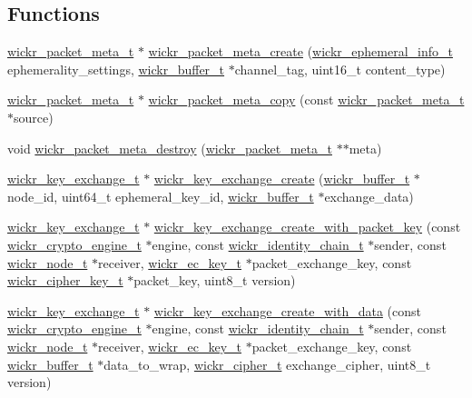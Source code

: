 \subsection*{Functions}
\begin{DoxyCompactItemize}
\item 
\hyperlink{structwickr__packet__meta}{wickr\+\_\+packet\+\_\+meta\+\_\+t} $\ast$ \hyperlink{group__wickr__protocol_ga146144d74da12c1fff766462fe7fa661}{wickr\+\_\+packet\+\_\+meta\+\_\+create} (\hyperlink{structwickr__ephemeral__info}{wickr\+\_\+ephemeral\+\_\+info\+\_\+t} ephemerality\+\_\+settings, \hyperlink{structwickr__buffer}{wickr\+\_\+buffer\+\_\+t} $\ast$channel\+\_\+tag, uint16\+\_\+t content\+\_\+type)
\item 
\hyperlink{structwickr__packet__meta}{wickr\+\_\+packet\+\_\+meta\+\_\+t} $\ast$ \hyperlink{group__wickr__protocol_ga1bb5a0f2a49069679b174b3e6521fe9b}{wickr\+\_\+packet\+\_\+meta\+\_\+copy} (const \hyperlink{structwickr__packet__meta}{wickr\+\_\+packet\+\_\+meta\+\_\+t} $\ast$source)
\item 
void \hyperlink{group__wickr__protocol_gad165ad670da761478cf5f8f91223c1d3}{wickr\+\_\+packet\+\_\+meta\+\_\+destroy} (\hyperlink{structwickr__packet__meta}{wickr\+\_\+packet\+\_\+meta\+\_\+t} $\ast$$\ast$meta)
\item 
\hyperlink{structwickr__key__exchange}{wickr\+\_\+key\+\_\+exchange\+\_\+t} $\ast$ \hyperlink{group__wickr__protocol_gac2823b3430070b0db9ef1f40d3a804ea}{wickr\+\_\+key\+\_\+exchange\+\_\+create} (\hyperlink{structwickr__buffer}{wickr\+\_\+buffer\+\_\+t} $\ast$node\+\_\+id, uint64\+\_\+t ephemeral\+\_\+key\+\_\+id, \hyperlink{structwickr__buffer}{wickr\+\_\+buffer\+\_\+t} $\ast$exchange\+\_\+data)
\item 
\hyperlink{structwickr__key__exchange}{wickr\+\_\+key\+\_\+exchange\+\_\+t} $\ast$ \hyperlink{group__wickr__protocol_ga26d4b847f11801354e4111d3ec1d1d13}{wickr\+\_\+key\+\_\+exchange\+\_\+create\+\_\+with\+\_\+packet\+\_\+key} (const \hyperlink{structwickr__crypto__engine}{wickr\+\_\+crypto\+\_\+engine\+\_\+t} $\ast$engine, const \hyperlink{structwickr__identity__chain}{wickr\+\_\+identity\+\_\+chain\+\_\+t} $\ast$sender, const \hyperlink{structwickr__node}{wickr\+\_\+node\+\_\+t} $\ast$receiver, \hyperlink{structwickr__ec__key}{wickr\+\_\+ec\+\_\+key\+\_\+t} $\ast$packet\+\_\+exchange\+\_\+key, const \hyperlink{structwickr__cipher__key}{wickr\+\_\+cipher\+\_\+key\+\_\+t} $\ast$packet\+\_\+key, uint8\+\_\+t version)
\item 
\hyperlink{structwickr__key__exchange}{wickr\+\_\+key\+\_\+exchange\+\_\+t} $\ast$ \hyperlink{group__wickr__protocol_ga9e69db5af6825e72c443dd5ef3605a5b}{wickr\+\_\+key\+\_\+exchange\+\_\+create\+\_\+with\+\_\+data} (const \hyperlink{structwickr__crypto__engine}{wickr\+\_\+crypto\+\_\+engine\+\_\+t} $\ast$engine, const \hyperlink{structwickr__identity__chain}{wickr\+\_\+identity\+\_\+chain\+\_\+t} $\ast$sender, const \hyperlink{structwickr__node}{wickr\+\_\+node\+\_\+t} $\ast$receiver, \hyperlink{structwickr__ec__key}{wickr\+\_\+ec\+\_\+key\+\_\+t} $\ast$packet\+\_\+exchange\+\_\+key, const \hyperlink{structwickr__buffer}{wickr\+\_\+buffer\+\_\+t} $\ast$data\+\_\+to\+\_\+wrap, \hyperlink{structwickr__cipher}{wickr\+\_\+cipher\+\_\+t} exchange\+\_\+cipher, uint8\+\_\+t version)
$$
\end{DoxyCompactItemize}
